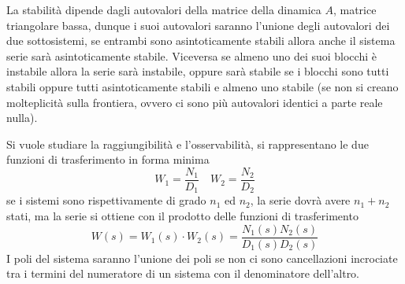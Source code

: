 La stabilità dipende dagli autovalori della matrice della dinamica $A$, matrice
triangolare bassa, dunque i suoi autovalori saranno l'unione degli autovalori
dei due sottosistemi, se entrambi sono asintoticamente stabili allora anche il
sistema serie sarà asintoticamente stabile.
Viceversa se almeno uno dei suoi blocchi è instabile allora la serie sarà
instabile, oppure sarà stabile se i blocchi sono tutti stabili oppure tutti
asintoticamente stabili e almeno uno stabile (se non si creano molteplicità
sulla frontiera, ovvero ci sono più autovalori identici a parte reale nulla).

Si vuole studiare la raggiungibilità e l'osservabilità, si rappresentano le due
funzioni di trasferimento in forma minima
$$
W_1 = \frac{N_1}{D_1} \quad W_2 = \frac{N_2}{D_2}
$$
se i sistemi sono rispettivamente di grado $n_1$ ed $n_2$, la serie dovrà avere
$n_1+n_2$ stati, ma la serie si ottiene con il prodotto delle funzioni di
trasferimento
$$
W(s) = W_1(s) \cdot W_2(s) = \frac{N_1(s)N_2(s)}{D_1(s)D_2(s)}
$$
I poli del sistema saranno l'unione dei poli se non ci sono cancellazioni
incrociate tra i termini del numeratore di un sistema con il denominatore
dell'altro.
